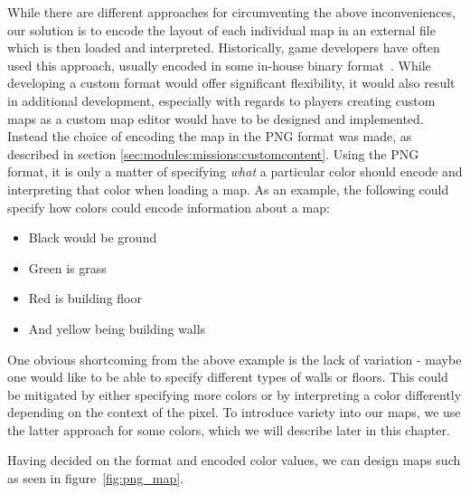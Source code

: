 While there are different approaches for circumventing the above inconveniences, our solution is to encode the layout of each individual map in an external file which is then loaded and interpreted.
Historically, game developers have often used this approach, usually encoded in some in-house binary format~\cite{quake-bsp-format}.
While developing a custom format would offer significant flexibility, it would also result in additional development, especially with regards to players creating custom maps as a custom map editor would have to be designed and implemented.
Instead the choice of encoding the map in the PNG format was made, as described in section \ref{sec:modules:missions:customcontent}.
Using the PNG format, it is only a matter of specifying \textit{what} a particular color should encode and interpreting that color when loading a map.
As an example, the following could specify how colors could encode information about a map:
\begin{itemize}
    \item Black would be ground
    \item Green is grass
    \item Red is building floor
    \item And yellow being building walls
\end{itemize}
One obvious shortcoming from the above example is the lack of variation - maybe one would like to be able to specify different types of walls or floors. 
This could be mitigated by either specifying more colors or by interpreting a color differently depending on the context of the pixel.
To introduce variety into our maps, we use the latter approach for some colors, which we will describe later in this chapter.

Having decided on the format and encoded color values, we can design maps such as seen in figure~\ref{fig:png_map}.

